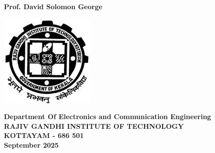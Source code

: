 \begin{center}
    {
        \large \bfseries
        Prof. David Solomon George
    }

    \vspace{35pt}

    \includegraphics {clg_logo.jpg}

    \vspace{35pt}

    {
        \large \bfseries
        Department Of Electronics and Communication Engineering \\
        \vspace{5pt}
        RAJIV GANDHI INSTITUTE OF TECHNOLOGY \\
        \vspace{5pt}
        KOTTAYAM - 686 501 \\
        \vspace{5pt}
        September 2025 \\
        \vspace{5pt}
    }


\end{center}


\pagebreak

